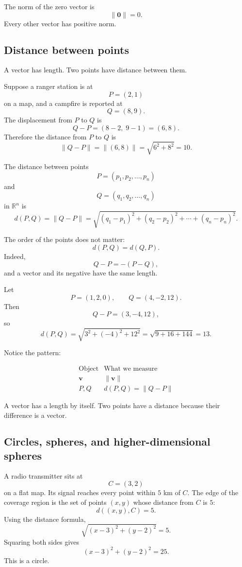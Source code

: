 The norm of the zero vector is
\[
    \|\mathbf 0\|=0.
\]
Every other vector has positive norm.

\subsection{Distance between points}

A vector has length.  Two points have distance between them.

Suppose a ranger station is at
\[
    P=(2,1)
\]
on a map, and a campfire is reported at
\[
    Q=(8,9).
\]
The displacement from \(P\) to \(Q\) is
\[
    Q-P=(8-2,\;9-1)=(6,8).
\]
Therefore the distance from \(P\) to \(Q\) is
\[
    \|Q-P\|
    =
    \|(6,8)\|
    =
    \sqrt{6^2+8^2}
    =
    10.
\]

\begin{definition}[Distance]
The distance between points
\[
    P=(p_1,p_2,\ldots,p_n)
\]
and
\[
    Q=(q_1,q_2,\ldots,q_n)
\]
in \(\mathbb R^n\) is
\[
    d(P,Q)
    =
    \|Q-P\|
    =
    \sqrt{(q_1-p_1)^2+(q_2-p_2)^2+\cdots+(q_n-p_n)^2}.
\]
\end{definition}

The order of the points does not matter:
\[
    d(P,Q)=d(Q,P).
\]
Indeed,
\[
    Q-P=-(P-Q),
\]
and a vector and its negative have the same length.

\begin{example}
Let
\[
    P=(1,2,0),\qquad Q=(4,-2,12).
\]
Then
\[
    Q-P=(3,-4,12),
\]
so
\[
    d(P,Q)
    =
    \sqrt{3^2+(-4)^2+12^2}
    =
    \sqrt{9+16+144}
    =
    13.
\]
\end{example}

Notice the pattern:

\[
\begin{array}{c|c}
\text{Object} & \text{What we measure} \\ \hline
\mathbf v & \|\mathbf v\| \\
P,Q & d(P,Q)=\|Q-P\|
\end{array}
\]

A vector has a length by itself.  Two points have a distance because their difference is
a vector.

\subsection{Circles, spheres, and higher-dimensional spheres}

A radio transmitter sits at
\[
    C=(3,2)
\]
on a flat map.  Its signal reaches every point within \(5\) km of \(C\).  The edge of the
coverage region is the set of points \((x,y)\) whose distance from \(C\) is \(5\):
\[
    d((x,y),C)=5.
\]
Using the distance formula,
\[
    \sqrt{(x-3)^2+(y-2)^2}=5.
\]
Squaring both sides gives
\[
    (x-3)^2+(y-2)^2=25.
\]
This is a circle.

